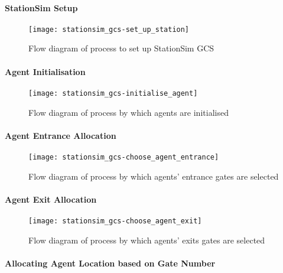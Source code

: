 \paragraph{StationSim Setup}\label{para:submodels:setup}

\begin{figure}[h]
    \centering
    \texttt{[image: stationsim\_gcs-set\_up\_station]}
    \caption{Flow diagram of process to set up StationSim
    GCS}\label{fig:flow:set_up_station}
\end{figure}

\paragraph{Agent Initialisation}\label{para:submodels:agent_init}

\begin{figure}[h]
    \centering
    \texttt{[image: stationsim\_gcs-initialise\_agent]}
    \caption{Flow diagram of process by which agents are
    initialised}\label{fig:flow:agent_initialisation}
\end{figure}

\paragraph{Agent Entrance Allocation}\label{para:submodels:agent_entrance}

\begin{figure}[h]
    \centering
    \texttt{[image: stationsim\_gcs-choose\_agent\_entrance]}
    \caption{Flow diagram of process by which agents' entrance gates are
    selected}\label{fig:flow:agent_entrance}
\end{figure}

\paragraph{Agent Exit Allocation}\label{para:submodels:agent_exit}

\begin{figure}[h]
    \centering
    \texttt{[image: stationsim\_gcs-choose\_agent\_exit]}
    \caption{Flow diagram of process by which agents' exits gates are
    selected}\label{fig:flow:agent_exit}
\end{figure}

\paragraph{Allocating Agent Location based on Gate
Number}\label{para:submodels:location_allocation}

